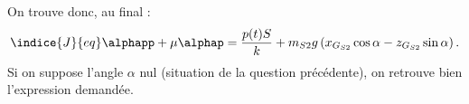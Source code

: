 \begin{multicols}{2}
\begin{corrige}
On trouve donc, au final :
 $$\indice{J}{eq} \alphapp + \mu \alphap =\dfrac{p(t)S}{k}+m_{S2} g\left( x_{G_{S2}}   \cos \alpha-z_{G_{S2}}  \sin\alpha\right) .$$
Si on suppose l'angle $\alpha$ nul (situation de la question précédente), on retrouve bien l'expression demandée.


\end{corrige}
\else
\fi

	

\ifprof
\else
\end{multicols}%
\fi

